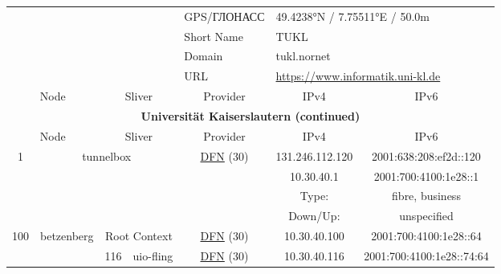 \begin{small}
\begin{center}
\begin{longtable}{|c|c|c|c|c|c|c|c|}
 \multicolumn{4}{|c|}{} & \multicolumn{1}{|l|}{GPS/ГЛОНАСС} & \multicolumn{3}{|l|}{49.4238°N / 7.75511°E / 50.0m} \\* \cline{5-5}\cline{6-6}\cline{7-7}\cline{8-8}
 \multicolumn{4}{|c|}{} & \multicolumn{1}{|l|}{Short Name} & \multicolumn{3}{|l|}{\nomenclature{TUKL}{Universität Kaiserslautern}\index{TUKL|see{Universität Kaiserslautern}}TUKL} \\* \cline{5-5}\cline{6-6}\cline{7-7}\cline{8-8}
 \multicolumn{4}{|c|}{} & \multicolumn{1}{|l|}{Domain} & \multicolumn{3}{|l|}{\index{tukl.nornet}tukl.nornet} \\* \cline{5-5}\cline{6-6}\cline{7-7}\cline{8-8}
 \multicolumn{4}{|c|}{} & \multicolumn{1}{|l|}{URL} & \multicolumn{3}{|l|}{\url{https://www.informatik.uni-kl.de}} \\ \hline
 \multicolumn{2}{|p{8em}|}{Node} & \multicolumn{2}{|p{8em}|}{Sliver} & \multicolumn{2}{|p{8em}|}{Provider} & IPv4 & IPv6 \\ \hline
\endfirsthead
\hline
 \multicolumn{8}{|c|}{\textbf{Universität Kaiserslautern (continued)}} \\ \hline
 \multicolumn{2}{|p{8em}|}{Node} & \multicolumn{2}{|p{8em}|}{Sliver} & \multicolumn{2}{|p{8em}|}{Provider} & IPv4 & IPv6 \\ \hline
\endhead
 \multirow{4}{*}{\tiny{1}} & \multicolumn{3}{|c|}{\multirow{4}{*}{\tiny{tunnelbox}}} & \multicolumn{2}{|c|}{\multirow{4}{*}{\tiny{\href{https://www.dfn.de}{DFN} (30)}}} & \tiny{131.246.112.120} & \tiny{2001:638:208:ef2d::120} \\* \cline{7-7}\cline{8-8}
  & \multicolumn{3}{|c|}{} & \multicolumn{2}{|c|}{} & \tiny{10.30.40.1} & \tiny{2001:700:4100:1e28::1} \\* \cline{7-7}\cline{8-8}
  & \multicolumn{3}{|c|}{} & \multicolumn{2}{|c|}{} & Type: & fibre, business \\* \cline{7-7}\cline{8-8}
  & \multicolumn{3}{|c|}{} & \multicolumn{2}{|c|}{} & Down/Up:  & unspecified \\ \hline
 \multirow{30}{*}{\tiny{100}} & \multicolumn{1}{|l|}{\multirow{30}{*}{\tiny{betzenberg}}} & \multicolumn{2}{|c|}{\tiny{Root Context}} & \multicolumn{2}{|c|}{\tiny{\href{https://www.dfn.de}{DFN} (30)}} & \tiny{10.30.40.100} & \tiny{2001:700:4100:1e28::64} \\* \cline{3-3}\cline{4-4}\cline{5-5}\cline{6-6}\cline{7-7}\cline{8-8}
  &  & \tiny{116} & \multicolumn{1}{|l|}{\tiny{uio-fling}} & \multicolumn{2}{|c|}{\tiny{\href{https://www.dfn.de}{DFN} (30)}} & \tiny{10.30.40.116} & \tiny{2001:700:4100:1e28::74:64} \\* \cline{3-3}\cline{4-4}\cline{5-5}\cline{6-6}\cline{7-7}\cline{8-8}

\end{longtable}
\end{center}
\end{small}

